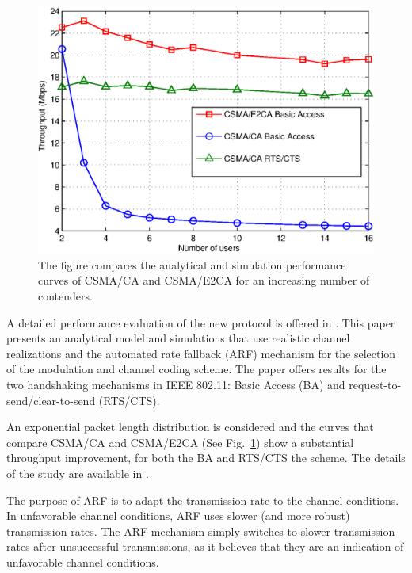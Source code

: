 \documentclass[journal]{IEEEtran}
\begin{document}
\begin{figure}[!t]
\centering
\includegraphics[width=\linewidth]{figures/performance}
\caption{The figure compares the analytical and simulation performance curves of CSMA/CA and CSMA/E2CA for an increasing number of contenders.}
\label{fig:performance}
\end{figure}

A detailed performance evaluation of the new protocol is offered in \cite{martorell2012pec}.
This paper presents an analytical model and simulations that use realistic channel realizations and the automated rate fallback (ARF) mechanism for the selection of the modulation and channel coding scheme.
The paper offers results for the two handshaking mechanisms in IEEE 802.11: Basic Access (BA) and request-to-send/clear-to-send (RTS/CTS).

An exponential packet length distribution is considered and the curves that compare CSMA/CA and CSMA/E2CA (See Fig.~\ref{fig:performance}) show a substantial throughput improvement, for both the BA and RTS/CTS the scheme.
The details of the study are available in \cite{martorell2012pec}.

The purpose of ARF is to adapt the transmission rate to the channel conditions.
In unfavorable channel conditions, ARF uses slower (and more robust) transmission rates.
The ARF mechanism simply switches to slower transmission rates after unsuccessful transmissions, as it believes that they are an indication of unfavorable channel conditions.
\end{document}
